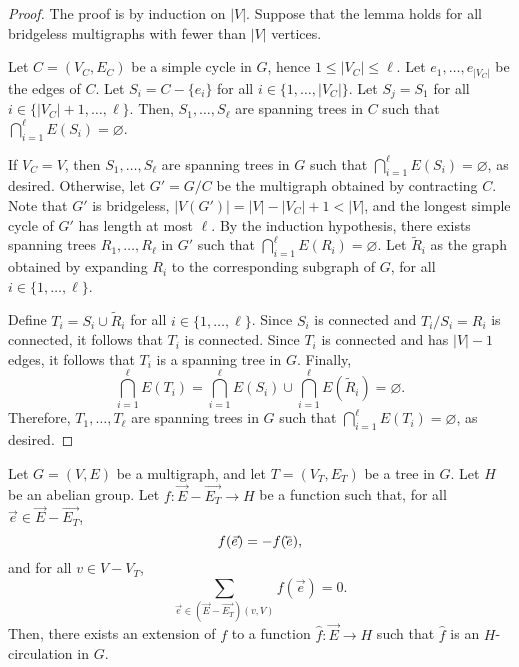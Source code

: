 \begin{proof}
    The proof is by induction on \(|V|\).
    Suppose that the lemma holds for all bridgeless multigraphs with fewer than \(|V|\) vertices.

    Let \(C = (V_C, E_C)\) be a simple cycle in \(G\), hence \(1 \leq |V_C| \leq \ell\).
    Let \(e_1, \ldots, e_{|V_C|}\) be the edges of \(C\).
    Let \(S_i = C - \{e_i\}\) for all \(i \in \{1, \ldots, |V_C|\}\).
    Let \(S_j = S_1\) for all \(i \in \{|V_C|+1, \ldots, \ell\}\).
    Then, \(S_1, \ldots, S_\ell\) are spanning trees in \(C\) such that
    \(\bigcap_{i=1}^\ell E(S_i) = \varnothing\).

    If \(V_C = V\), then \(S_1, \ldots, S_\ell\) are spanning trees in \(G\) such that \(\bigcap_{i=1}^\ell E(S_i) = \varnothing\), as desired.
    Otherwise, let \(G' = G / C\) be the multigraph obtained by contracting \(C\).
    Note that \(G'\) is bridgeless,
    \(|V(G')| = |V| - |V_C| + 1 < |V|\),
    and the longest simple cycle of \(G'\) has length at most \(\ell\).
    By the induction hypothesis,
    there exists spanning trees \(R_1, \ldots, R_{\ell}\) in \(G'\) such that \(\bigcap_{i=1}^\ell E(R_i) = \varnothing\).
    Let \(\tilde{R}_i\) as the graph obtained by expanding \(R_i\) to the corresponding subgraph of \(G\), for all \(i \in \{1, \ldots, \ell\}\).

    Define \(T_i = S_i \cup \tilde{R}_i\) for all \(i \in \{1, \ldots, \ell\}\).
    Since \(S_i\) is connected and \(T_i / S_i = R_i\) is connected, it follows that \(T_i\) is connected.
    Since \(T_i\) is connected and has \(|V|-1\) edges, it follows that \(T_i\) is a spanning tree in \(G\).
    Finally,
    \begin{equation*}
        \bigcap_{i=1}^\ell E(T_i)
        =
        \bigcap_{i=1}^\ell E(S_i) \cup \bigcap_{i=1}^\ell E(\tilde{R}_i)
        = \varnothing.
    \end{equation*}
    Therefore, \(T_1, \ldots, T_\ell\) are spanning trees in \(G\) such that \(\bigcap_{i=1}^\ell E(T_i) = \varnothing\), as desired.
\end{proof}

\begin{lemma} \label{lem:circulation-extension}
    Let \(G = (V, E)\) be a multigraph, and let \(T = (V_T, E_T)\) be a tree in \(G\).
    Let \(H\) be an abelian group.
    Let \(f \colon \vec{E} - \vec{E_T} \to H\) be a function such that, for all \(\vec{e} \in \vec{E} - \vec{E_T}\),
    \begin{equation} \label{eq:vec-cev}
        f(\vec{e}) = -f(\cev{e}),
    \end{equation}
    and for all \(v \in V - V_T\),
    \begin{equation} \label{eq:sum-zero}
        \sum_{\vec{e} \in (\vec{E} - \vec{E_T})(v, V)} f(\vec{e}) = 0.
    \end{equation}
    Then, there exists an extension of \(f\) to a function \(\hat{f} \colon \vec{E} \to H\) such that \(\hat{f}\) is an \(H\)-circulation in \(G\).
\end{lemma}

